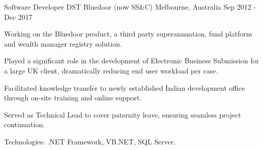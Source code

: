 \begin{cventries}
\cventry
{Software Developer} %
{DST Bluedoor (now SS\&C)} %
{Melbourne, Australia} %
{Sep 2012 - Dec 2017} %
{
  \begin{cvitems} %
    \item {Working on the Bluedoor product, a third party superannuation, fund platform and wealth manager registry solution.}
    \item {Played a significant role in the development of Electronic Business Submission for a large UK client, dramatically reducing end user workload per case.}
    \item {Facilitated knowledge transfer to newly established Indian development office through on-site training and online support.}
    \item {Served as Technical Lead to cover paternity leave, ensuring seamless project continuation.}
    \item {Technologies: .NET Framework, VB.NET, SQL Server.}
  \end{cvitems}
}

\end{cventries}
